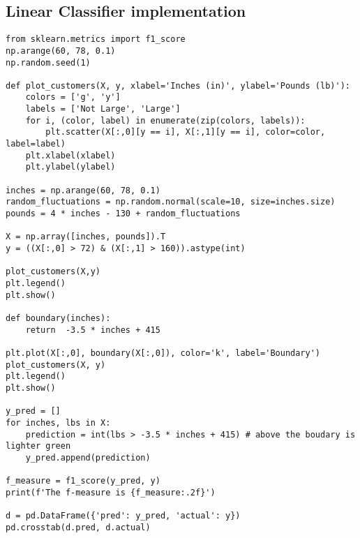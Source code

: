 \documentclass[article]{llncs}
\begin{document}
\subsection{Linear Classifier implementation}
\begin{verbatim}
from sklearn.metrics import f1_score
np.arange(60, 78, 0.1)
np.random.seed(1)

def plot_customers(X, y, xlabel='Inches (in)', ylabel='Pounds (lb)'): 
    colors = ['g', 'y']
    labels = ['Not Large', 'Large']
    for i, (color, label) in enumerate(zip(colors, labels)):
        plt.scatter(X[:,0][y == i], X[:,1][y == i], color=color, label=label)
    plt.xlabel(xlabel)
    plt.ylabel(ylabel)

inches = np.arange(60, 78, 0.1)
random_fluctuations = np.random.normal(scale=10, size=inches.size) 
pounds = 4 * inches - 130 + random_fluctuations

X = np.array([inches, pounds]).T
y = ((X[:,0] > 72) & (X[:,1] > 160)).astype(int)

plot_customers(X,y)
plt.legend()
plt.show()

def boundary(inches): 
    return  -3.5 * inches + 415

plt.plot(X[:,0], boundary(X[:,0]), color='k', label='Boundary') 
plot_customers(X, y)
plt.legend()
plt.show()

y_pred = []
for inches, lbs in X:
    prediction = int(lbs > -3.5 * inches + 415) # above the boudary is lighter green
    y_pred.append(prediction)

f_measure = f1_score(y_pred, y)
print(f'The f-measure is {f_measure:.2f}')

d = pd.DataFrame({'pred': y_pred, 'actual': y})
pd.crosstab(d.pred, d.actual)
\end{verbatim}
\end{document}
